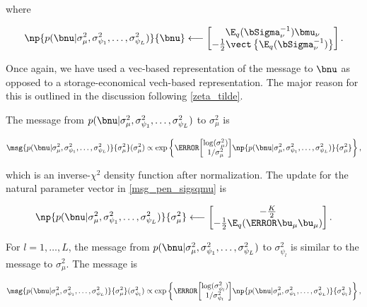 \documentclass[12pt]{article}
\def\Sigmanu{\bSigma_{\nu}}
\def\munu{\bmu_{\nu}}
\def\sigsqmu{\sigma^2_{\mu}}
\def\umu{\bu_\mu}
\newcommand\sigsqpsi[1]{\sigma^2_{\psi_{#1}}}
\theoremstyle{plain}
\theoremstyle{definition}
\theoremstyle{remark}
\begin{document}
\noindent where

\begin{equation}
	\np{p (\bnu | \sigsqmu, \sigsqpsi{1}, \dots, \sigsqpsi{L})}{\bnu}
		\longleftarrow
			\begin{bmatrix}
				\E_q (\Sigmanu^{-1}) \munu \\
				-\frac12 \vect \left\{ \E_q (\Sigmanu^{-1}) \right\}
			\end{bmatrix}.
\label{np_pen_nu}
\end{equation}

\noindent Once again, we have used a vec-based representation of the message to $\bnu$ as opposed to
a storage-economical vech-based representation. The major reason for this is outlined in the discussion following
\eqref{zeta_tilde}.

The message from $p (\bnu | \sigsqmu, \sigsqpsi{1}, \dots, \sigsqpsi{L})$ to $\sigsqmu$ is

\begin{equation}
	\msg{p (\bnu | \sigsqmu, \sigsqpsi{1}, \dots, \sigsqpsi{L})}{\sigsqmu} (\sigsqmu)
		\propto
			\exp \left\{
				\T{\begin{bmatrix}
					\log (\sigsqmu) \\
					1/\sigsqmu
				\end{bmatrix}} 
				\np{p (\bnu | \sigsqmu, \sigsqpsi{1}, \dots, \sigsqpsi{L})}{\sigsqmu}
			\right\},
\label{msg_pen_sigsqmu}
\end{equation}

\noindent which is an inverse-$\chi^2$ density function after normalization. The update for the natural parameter vector
in \eqref{msg_pen_sigsqmu} is

\begin{equation}
	\np{p (\bnu | \sigsqmu, \sigsqpsi{1}, \dots, \sigsqpsi{L})}{\sigsqmu}
		\longleftarrow
			\begin{bmatrix}
				-\frac{K}{2} \\
				-\frac12 \E_q (\T{\umu} \umu)
			\end{bmatrix}.
\label{np_pen_sigsqmu}
\end{equation}

For $l = 1, \dots, L$, the message from $p (\bnu | \sigsqmu, \sigsqpsi{1}, \dots, \sigsqpsi{L})$ to $\sigsqpsi{l}$
is similar to the message to $\sigsqmu$. The message is

\begin{equation}
	\msg{p (\bnu | \sigsqmu, \sigsqpsi{1}, \dots, \sigsqpsi{L})}{\sigsqmu} (\sigsqpsi{l})
		\propto
			\exp \left\{
				\T{\begin{bmatrix}
					\log (\sigsqpsi{l}) \\
					1/\sigsqpsi{l}
				\end{bmatrix}} 
				\np{p (\bnu | \sigsqmu, \sigsqpsi{1}, \dots, \sigsqpsi{L})}{\sigsqpsi{l}}
			\right\},
\label{msg_pen_sigsqpsi}
\end{equation}
\end{document}
